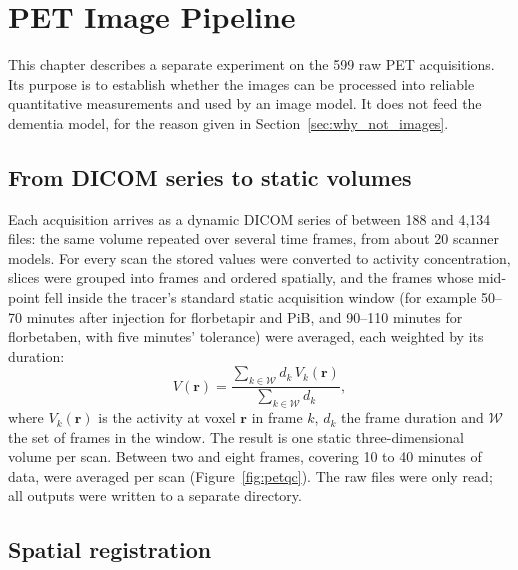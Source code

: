 \chapter{PET Image Pipeline}
\label{ch:petimages}

This chapter describes a separate experiment on the 599 raw PET acquisitions. Its purpose is to establish whether the images can be processed into reliable quantitative measurements and used by an image model. It does not feed the dementia model, for the reason given in Section~\ref{sec:why_not_images}.

\section{From DICOM series to static volumes}

Each acquisition arrives as a dynamic DICOM series of between 188 and 4,134 files: the same volume repeated over several time frames, from about 20 scanner models. For every scan the stored values were converted to activity concentration, slices were grouped into frames and ordered spatially, and the frames whose mid-point fell inside the tracer's standard static acquisition window (for example 50--70 minutes after injection for florbetapir and PiB, and 90--110 minutes for florbetaben, with five minutes' tolerance) were averaged, each weighted by its duration:
\begin{equation}
V(\mathbf{r}) = \frac{\sum_{k \in \mathcal{W}} d_k\, V_k(\mathbf{r})}{\sum_{k \in \mathcal{W}} d_k},
\end{equation}
where $V_k(\mathbf{r})$ is the activity at voxel $\mathbf{r}$ in frame $k$, $d_k$ the frame duration and $\mathcal{W}$ the set of frames in the window. The result is one static three-dimensional volume per scan. Between two and eight frames, covering 10 to 40 minutes of data, were averaged per scan (Figure~\ref{fig:petqc}). The raw files were only read; all outputs were written to a separate directory.

\section{Spatial registration}

